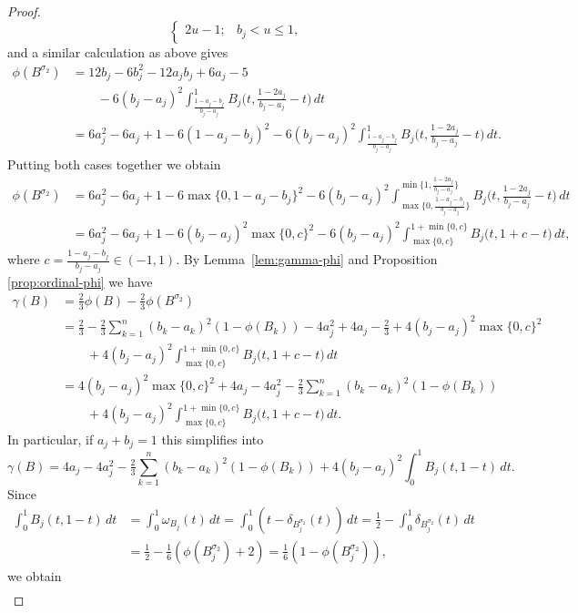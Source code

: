 \documentclass[12pt,a4paper]{amsart}
\theoremstyle{definition}
\begin{document}
\begin{proof}
$$\begin{cases}
		2u-1; &  b_j < u \le 1,
    \end{cases}$$
and a similar calculation as above gives
\begin{align*}
\phi(B^{\sigma_2}) &= 12b_j-6b_j^2-12a_jb_j+6a_j-5 \\
&\qquad- 6(b_j-a_j)^2\int_{\frac{1-a_j-b_j}{b_j-a_j}}^{1} B_j\big(t, \tfrac{1-2a_j}{b_j-a_j}-t\big) \, dt \\
&=6a_j^2-6a_j+1-6(1-a_j-b_j)^2 - 6(b_j-a_j)^2\int_{\frac{1-a_j-b_j}{b_j-a_j}}^{1} B_j\big(t, \tfrac{1-2a_j}{b_j-a_j}-t\big) \, dt.
\end{align*}
Putting both cases together we obtain
\begin{align*}
    \phi(B^{\sigma_2}) &= 6a_j^2-6a_j+1-6\max\{0,1-a_j-b_j\}^2 - 6(b_j-a_j)^2\int_{\max\big\{0,\frac{1-a_j-b_j}{b_j-a_j}\big\}}^{\min\big\{1,\frac{1-2a_j}{b_j-a_j}\big\}} B_j\big(t, \tfrac{1-2a_j}{b_j-a_j}-t\big) \, dt\\
&=6a_j^2-6a_j+1-6(b_j-a_j)^2\max\{0,c\}^2- 6(b_j-a_j)^2\int_{\max\{0,c\}}^{1+\min\{0,c\}} B_j\big(t,1+c-t\big) \, dt,
\end{align*}
where $c=\frac{1-a_j-b_j}{b_j-a_j} \in (-1,1)$.
By Lemma~\ref{lem:gamma-phi} and Proposition \ref{prop:ordinal-phi} we have
\begin{align*}
   \gamma(B) &= \tfrac23 \phi(B) - \tfrac23 \phi(B^{\sigma_2}) \\
   &= \tfrac23 - \tfrac23\sum_{k=1}^n (b_k-a_k)^2(1-\phi(B_k)) - 4a_j^2 + 4a_j - \tfrac23+4(b_j-a_j)^2\max\{0,c\}^2  \\
   &\qquad+ 4(b_j-a_j)^2\int_{\max\{0,c\}}^{1+\min\{0,c\}} B_j\big(t,1+c-t\big) \, dt \\
   &= 4(b_j-a_j)^2\max\{0,c\}^2 + 4a_j - 4a_j^2 - \tfrac23\sum_{k=1}^n (b_k-a_k)^2(1-\phi(B_k)) \\
   &\qquad+ 4(b_j-a_j)^2\int_{\max\{0,c\}}^{1+\min\{0,c\}} B_j\big(t,1+c-t\big) \, dt. 
\end{align*}
In particular, if $a_j+b_j=1$ this simplifies into
$$\gamma(B) = 4a_j - 4a_j^2 - \tfrac23\sum_{k=1}^n (b_k-a_k)^2(1-\phi(B_k)) + 4(b_j-a_j)^2\int_0^1 B_j(t, 1-t) \, dt. $$
Since 
\begin{align*}
\int_0^1 B_j(t, 1-t) \, dt &= \int_0^1 \omega_{B_j}(t) \, dt = \int_0^1 (t-\delta_{B_j^{\sigma_2}}(t)) \, dt = \tfrac12-\int_0^1 \delta_{B_j^{\sigma_2}}(t) \, dt \\
&= \tfrac12-\tfrac16(\phi(B_j^{\sigma_2})+2) = \tfrac16(1-\phi(B_j^{\sigma_2})),
\end{align*}
we obtain
\begin{align*}

\end{align*}
\end{proof}
\end{document}
